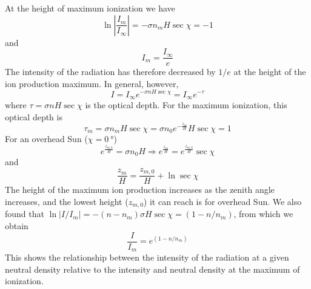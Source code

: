 At the height of maximum ionization we have
\begin{equation*}
    \ln\left|\frac{I_m}{I_\infty}\right|=-\sigma n_{m}H\sec\chi=-1
\end{equation*}
and
\begin{equation*}
    I_m=\frac{I_\infty}{e}
\end{equation*}
The intensity of the radiation has therefore decreased by \(1/e\) at the height of the ion production maximum. In general, however,
\begin{equation*}
    I=I_\infty e^{-\sigma nH\sec\chi}=I_\infty e^{-\tau}
\end{equation*}
where \(\tau=\sigma nH\sec\chi \) is the optical depth. For the maximum ionization, this optical depth is
\begin{equation*}
    \tau_m=\sigma n_{m}H\sec\chi=\sigma n_0e^{-\frac{z_m}{H}}H\sec\chi=1
\end{equation*}
For an overhead Sun (\(\chi=\SI{0}{\degree}\))
\begin{equation*}
    e^{\frac{z_{m,0}}{H}}=\sigma n_0H \Rightarrow e^{\frac{z_m}{H}}=e^{\frac{z_{m,0}}{H}}\sec\chi
\end{equation*}
and
\begin{equation*}
    \frac{z_m}{H}=\frac{z_{m,0}}{H}+\ln\sec\chi
\end{equation*}
The height of the maximum ion production increases as the zenith angle increases, and the lowest height (\(z_{m,0}\)) it can reach is for overhead Sun. We also found that \(\ln|I/I_m|=-(n-n_m)\sigma H\sec\chi=(1-n/n_m)\), from which we obtain
\begin{equation*}
    \frac{I}{I_m}=e^{\left(1-n/n_m\right)}
\end{equation*}
This shows the relationship between the intensity of the radiation at a given neutral density relative to the intensity and neutral density at the maximum of ionization.

